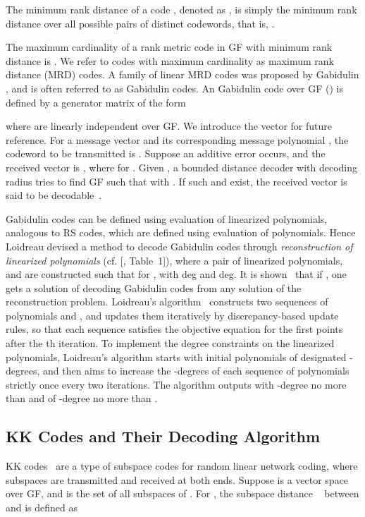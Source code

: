 \documentclass[11pt,onecolumn,draftcls]{IEEEtran}
\begin{document}
The minimum rank distance of a code , denoted as  , is simply the minimum rank distance
over all possible pairs of distinct codewords, that is, .


The maximum cardinality of a rank metric code in GF with minimum rank distance  is  \cite{delsarte_jct78, gabidulin_pit0185, roth_it91}. We refer to codes with maximum cardinality as maximum rank distance (MRD) codes.
A family of linear MRD codes was proposed by Gabidulin \cite{gabidulin_pit0185}, and is often referred to as Gabidulin codes.
An  Gabidulin code  over GF () is defined by a generator matrix  of the form

where  are linearly independent over GF. We introduce the vector  for future reference. For a message vector  and its corresponding message polynomial , the codeword to be transmitted is . Suppose an additive error  occurs, and the received vector is , where  for . Given , a bounded distance decoder with decoding radius  tries to find  GF such that  with . If such  and  exist, the received vector  is said to be decodable~\cite{gabidulin_pit0185}.

Gabidulin codes can be defined using evaluation of linearized polynomials, analogous to RS codes, which are defined using evaluation of polynomials. Hence Loidreau devised a method to decode Gabidulin codes through \emph{reconstruction of linearized polynomials}\makeatletter
    \renewcommand\@cite [1]{#1}
    \makeatother (cf. [\cite{loidreau_wcc05}, Table~1]),\makeatletter
    \renewcommand\@cite [1] {[#1]}
    \makeatother
where a pair of linearized polynomials,  and  are constructed such that  for , with deg and deg. It is shown~\cite{loidreau_wcc05} that if , one gets a solution of decoding Gabidulin codes from any solution of the reconstruction problem. Loidreau's algorithm~\cite{loidreau_wcc05} constructs two sequences of polynomials  and , and updates them iteratively by discrepancy-based update rules, so that each sequence satisfies the objective equation for the first  points after the th iteration. To implement the degree constraints on the linearized polynomials, Loidreau's algorithm starts with initial polynomials of designated -degrees, and then aims to increase the -degrees of each sequence of polynomials strictly once every two iterations. The algorithm outputs  with -degree no more than  and  of -degree no more than .

\subsection{KK Codes and Their Decoding Algorithm}
\label{sec: introKK}
KK codes~\cite{kotter_it08} are a type of subspace codes for random linear network coding, where subspaces are transmitted and received at both ends. Suppose  is a vector space over GF, and  is the set of all subspaces of . For , the subspace distance ~\cite{kotter_it08} between  and  is defined as
\end{document}
